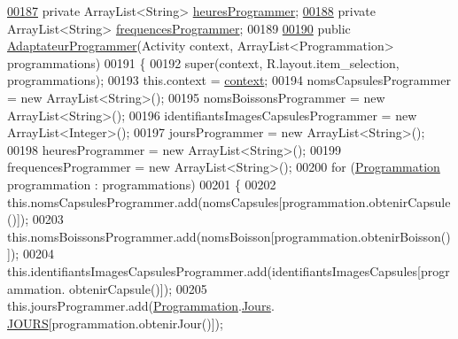 \begin{DoxyCode}
\hyperlink{classcom_1_1example_1_1ekawa_1_1_ihm_1_1_adaptateur_programmer_a114578f4eb2a34e7d3a258635c2ad9f1}{00187}         \textcolor{keyword}{private} ArrayList<String> \hyperlink{classcom_1_1example_1_1ekawa_1_1_ihm_1_1_adaptateur_programmer_a114578f4eb2a34e7d3a258635c2ad9f1}{heuresProgrammer};
\hyperlink{classcom_1_1example_1_1ekawa_1_1_ihm_1_1_adaptateur_programmer_a877b83e1a28ac8f704052df39aad695e}{00188}         \textcolor{keyword}{private} ArrayList<String> \hyperlink{classcom_1_1example_1_1ekawa_1_1_ihm_1_1_adaptateur_programmer_a877b83e1a28ac8f704052df39aad695e}{frequencesProgrammer};
00189 
\hyperlink{classcom_1_1example_1_1ekawa_1_1_ihm_1_1_adaptateur_programmer_a8a6bb79a26e790339065f37777890a34}{00190}         \textcolor{keyword}{public} \hyperlink{classcom_1_1example_1_1ekawa_1_1_ihm_1_1_adaptateur_programmer_a8a6bb79a26e790339065f37777890a34}{AdaptateurProgrammer}(Activity context, ArrayList<Programmation> 
      programmations)
00191         \{
00192             super(context, R.layout.item\_selection, programmations);
00193             this.context = \hyperlink{classcom_1_1example_1_1ekawa_1_1_ihm_1_1_adaptateur_selection_a9605d2f9384114fcb57da610a7071676}{context};
00194             nomsCapsulesProgrammer = \textcolor{keyword}{new} ArrayList<String>();
00195             nomsBoissonsProgrammer = \textcolor{keyword}{new} ArrayList<String>();
00196             identifiantsImagesCapsulesProgrammer = \textcolor{keyword}{new} ArrayList<Integer>();
00197             joursProgrammer = \textcolor{keyword}{new} ArrayList<String>();
00198             heuresProgrammer = \textcolor{keyword}{new} ArrayList<String>();
00199             frequencesProgrammer = \textcolor{keyword}{new} ArrayList<String>();
00200             \textcolor{keywordflow}{for} (\hyperlink{classcom_1_1example_1_1ekawa_1_1_programmation}{Programmation} programmation : programmations)
00201             \{
00202                 this.nomsCapsulesProgrammer.add(nomsCapsules[programmation.obtenirCapsule()]);
00203                 this.nomsBoissonsProgrammer.add(nomsBoisson[programmation.obtenirBoisson()]);
00204                 this.identifiantsImagesCapsulesProgrammer.add(identifiantsImagesCapsules[programmation.
      obtenirCapsule()]);
00205                 this.joursProgrammer.add(\hyperlink{classcom_1_1example_1_1ekawa_1_1_programmation}{Programmation}.\hyperlink{classcom_1_1example_1_1ekawa_1_1_programmation_1_1_jours}{Jours}.
      \hyperlink{classcom_1_1example_1_1ekawa_1_1_programmation_1_1_jours_a45d873d90f82a1cdeabeba21a37b7aba}{JOURS}[programmation.obtenirJour()]);

\end{DoxyCode}
